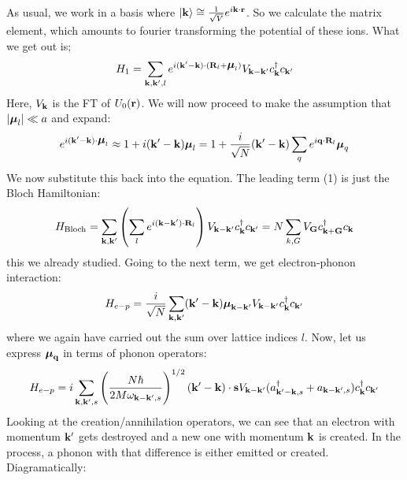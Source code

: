 As usual, we work in a basis where $\lvert \mathbf{k} \rangle \cong \frac{1}{\sqrt{V}}e^{i\mathbf{k} \cdot \mathbf{r}}$. So we calculate the matrix element, which amounts to fourier transforming the potential of these ions. What we get out is;
\begin{equation}
    H_1 = \sum_{\mathbf{k}, \mathbf{k}', l} e^{i(\mathbf{k}' - \mathbf{k}) \cdot (\mathbf{R}_l + \mbox{\boldmath$ \mu $}_l)}V_{\mathbf{k} - \mathbf{k}'}c^\dagger_{\mathbf{k}}c_{\mathbf{k}'}
\end{equation}
Here, $V_{\mathbf{k}}$ is the FT of $U_0(\mathbf{r})$. We will now proceed to make the assumption that $\lvert \mbox{\boldmath$ \mu $}_l \rvert \ll a$ and expand:
\begin{equation}
    e^{i(\mathbf{k}' - \mathbf{k})\cdot\mbox{\boldmath$ \mu $}_l} \approx 1 + i(\mathbf{k}' - \mathbf{k})\mbox{\boldmath$ \mu $}_l = 1 + \frac{i}{\sqrt{N}}(\mathbf{k}' - \mathbf{k})\sum_q e^{i\mathbf{q} \cdot \mathbf{R}_l}\mbox{\boldmath$ \mu $}_q
\end{equation}
We now substitute this back into the equation. The leading term (1) is just the Bloch Hamiltonian:
\begin{equation}
    H_{\text{Bloch}} = \sum_{\mathbf{k}, \mathbf{k}'}\left(\sum_l e^{i(\mathbf{k} - \mathbf{k}')\cdot \mathbf{R}_l}\right)V_{\mathbf{k} - \mathbf{k}'}c^\dagger_{\mathbf{k}}c_{\mathbf{k}'} = N\sum_{k, G}V_{\mathbf{G}}c^\dagger_{\mathbf{k} + \mathbf{G}}c_{\mathbf{k}}
\end{equation}
this we already studied. Going to the next term, we get electron-phonon interaction:
\begin{equation}
    H_{e-p} = \frac{i}{\sqrt{N}}\sum_{\mathbf{k}, \mathbf{k}'}(\mathbf{k}' - \mathbf{k})\mbox{\boldmath$ \mu $}_{\mathbf{k} - \mathbf{k}'}V_{\mathbf{k} - \mathbf{k}'}c^\dagger_{\mathbf{k}}c_{\mathbf{k}'}
\end{equation}
where we again have carried out the sum over lattice indices $l$. Now, let us express $\mbox{\boldmath$ \mu $}_{\mathbf{q}}$ in terms of phonon operators:
\begin{equation}
    H_{e-p} = i\sum_{\mathbf{k}, \mathbf{k}', s}\left(\frac{N\hbar}{2M\omega_{\mathbf{k} - \mathbf{k}', s}}\right)^{1/2}(\mathbf{k}' - \mathbf{k})\cdot \mathbf{s}V_{\mathbf{k} - \mathbf{k}'}(a^\dagger_{\mathbf{k}' - \mathbf{k}, s} + a_{\mathbf{k} - \mathbf{k}', s})c^\dagger_{\mathbf{k}}c_{\mathbf{k}'}
\end{equation}
Looking at the creation/annihilation operators, we can see that an electron with momentum $\mathbf{k}'$ gets destroyed and a new one with momentum $\mathbf{k}$ is created. In the process, a phonon with that difference is either emitted or created. Diagramatically:

